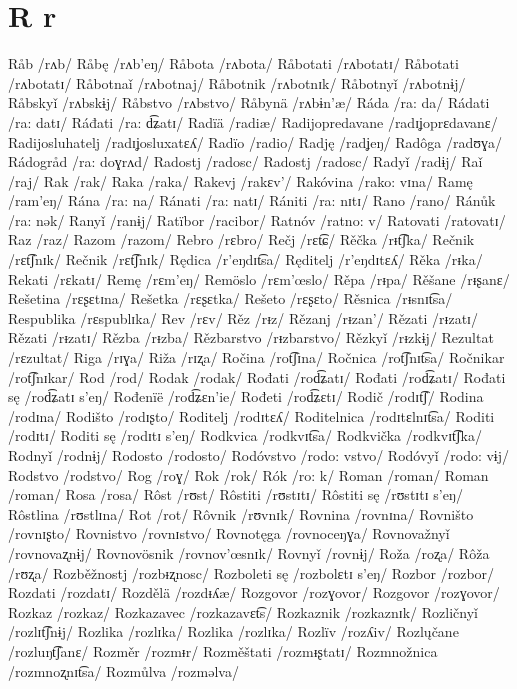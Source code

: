 \chapter{R r}

Råb /rʌb/
Råbę /rʌb’eŋ/
Råbota /rʌbota/
Råbotati /rʌbotatɪ/
Råbotati /rʌbotatɪ/
Råbotnaǐ /rʌbotnaj/
Råbotnik /rʌbotnɪk/
Råbotnyǐ /rʌbotnɨj/
Råbskyǐ /rʌbskɨj/
Råbstvo /rʌbstvo/
Råbynä /rʌbɨn’æ/
Ráda /ra: da/
Rádati /ra: datɪ/
Ráđati /ra: d͡ʑatɪ/
Radïä /radiæ/
Radijopredavane /radɪʝoprɛdavanɛ/
Radijosluhatelj /radɪʝosluxatɛʎ/
Radïo /radio/
Radję /radʝeŋ/
Radôga /radʊɣa/
Rádogråd /ra: doɣrʌd/
Radostj /radosc/
Radostj /radosc/
Radyǐ /radɨj/
Raǐ /raj/
Rak /rak/
Raka /raka/
Rakevj /rakɛv’/
Rakóvina /rako: vɪna/
Ramę /ram’eŋ/
Rána /ra: na/
Ránati /ra: natɪ/
Rániti /ra: nɪtɪ/
Rano /rano/
Ránůk /ra: nək/
Ranyǐ /ranɨj/
Ratïbor /racibor/
Ratnóv /ratno: v/
Ratovati /ratovatɪ/
Raz /raz/
Razom /razom/
Rebro /rɛbro/
Rečj /rɛt͡ɕ/
Rěčka /rᵻt͡ʃka/
Rečnik /rɛt͡ʃnɪk/
Rečnik /rɛt͡ʃnɪk/
Rędica /r’eŋdɪt͡sa/
Ręditelj /r’eŋdɪtɛʎ/
Rěka /rᵻka/
Rekati /rɛkatɪ/
Remę /rɛm’eŋ/
Remöslo /rɛm’œslo/
Rěpa /rᵻpa/
Rěšane /rᵻʂanɛ/
Rešetina /rɛʂɛtɪna/
Rešetka /rɛʂɛtka/
Rešeto /rɛʂɛto/
Rěsnica /rᵻsnɪt͡sa/
Respublika /rɛspublɪka/
Rev /rɛv/
Rěz /rᵻz/
Rězanj /rᵻzan’/
Rězati /rᵻzatɪ/
Rězati /rᵻzatɪ/
Rězba /rᵻzba/
Rězbarstvo /rᵻzbarstvo/
Rězkyǐ /rᵻzkɨj/
Rezultat /rɛzultat/
Riga /rɪɣa/
Riža /rɪʐa/
Ročina /rot͡ʃɪna/
Ročnica /rot͡ʃnɪt͡sa/
Ročnikar /rot͡ʃnɪkar/
Rod /rod/
Rodak /rodak/
Rođati /rod͡ʑatɪ/
Rođati /rod͡ʑatɪ/
Rođati sę /rod͡ʑatɪ s’eŋ/
Rođenïë /rod͡ʑɛn’ie/
Rođeti /rod͡ʑɛtɪ/
Rodič /rodɪt͡ʃ/
Rodina /rodɪna/
Rodišto /rodɪʂto/
Roditelj /rodɪtɛʎ/
Roditelnica /rodɪtɛlnɪt͡sa/
Roditi /rodɪtɪ/
Roditi sę /rodɪtɪ s’eŋ/
Rodkvica /rodkvɪt͡sa/
Rodkvička /rodkvɪt͡ʃka/
Rodnyǐ /rodnɨj/
Rodosto /rodosto/
Rodóvstvo /rodo: vstvo/
Rodóvyǐ /rodo: vɨj/
Rodstvo /rodstvo/
Rog /roɣ/
Rok /rok/
Rók /ro: k/
Roman /roman/
Roman /roman/
Rosa /rosa/
Rôst /rʊst/
Rôstiti /rʊstɪtɪ/
Rôstiti sę /rʊstɪtɪ s’eŋ/
Rôstlina /rʊstlɪna/
Rot /rot/
Rôvnik /rʊvnɪk/
Rovnina /rovnɪna/
Rovništo /rovnɪʂto/
Rovnistvo /rovnɪstvo/
Rovnotęga /rovnoceŋɣa/
Rovnovažnyǐ /rovnovaʐnɨj/
Rovnovösnik /rovnov’œsnɪk/
Rovnyǐ /rovnɨj/
Roža /roʐa/
Rôža /rʊʐa/
Rozběžnostj /rozbᵻʐnosc/
Rozboleti sę /rozbolɛtɪ s’eŋ/
Rozbor /rozbor/
Rozdati /rozdatɪ/
Rozdělä /rozdᵻʎæ/
Rozgovor /rozɣovor/
Rozgovor /rozɣovor/
Rozkaz /rozkaz/
Rozkazavec /rozkazavɛt͡s/
Rozkaznik /rozkaznɪk/
Rozličnyǐ /rozlɪt͡ʃnɨj/
Rozlika /rozlɪka/
Rozlika /rozlɪka/
Rozlïv /rozʎiv/
Rozlųčane /rozluŋt͡ʃanɛ/
Rozměr /rozmᵻr/
Rozměštati /rozmᵻʂtatɪ/
Rozmnožnica /rozmnoʐnɪt͡sa/
Rozmůlva /rozməlva/
